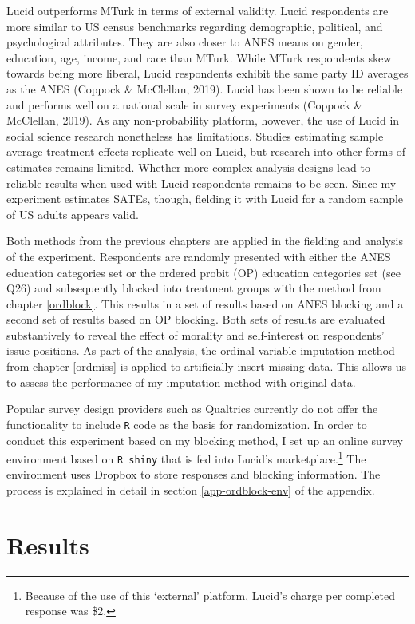 \documentclass[12pt,econ]{sources/authesis}
\begin{document}
Lucid outperforms MTurk in terms of external validity. Lucid respondents are more similar to US census benchmarks regarding demographic, political, and psychological attributes. They are also closer to ANES means on gender, education, age, income, and race than MTurk. While MTurk respondents skew towards being more liberal, Lucid respondents exhibit the same party ID averages as the ANES (Coppock \& McClellan, 2019). Lucid has been shown to be reliable and performs well on a national scale in survey experiments (Coppock \& McClellan, 2019). As any non-probability platform, however, the use of Lucid in social science research nonetheless has limitations. Studies estimating sample average treatment effects replicate well on Lucid, but research into other forms of estimates remains limited. Whether more complex analysis designs lead to reliable results when used with Lucid respondents remains to be seen. Since my experiment estimates SATEs, though, fielding it with Lucid for a random sample of US adults appears valid.

Both methods from the previous chapters are applied in the fielding and analysis of the experiment. Respondents are randomly presented with either the ANES education categories set or the ordered probit (OP) education categories set (see Q26) and subsequently blocked into treatment groups with the method from chapter \ref{ordblock}. This results in a set of results based on ANES blocking and a second set of results based on OP blocking. Both sets of results are evaluated substantively to reveal the effect of morality and self-interest on respondents' issue positions. As part of the analysis, the ordinal variable imputation method from chapter \ref{ordmiss} is applied to artificially insert missing data. This allows us to assess the performance of my imputation method with original data.

Popular survey design providers such as Qualtrics currently do not offer the functionality to include \texttt{R} code as the basis for randomization. In order to conduct this experiment based on my blocking method, I set up an online survey environment based on \texttt{R\ shiny} that is fed into Lucid's marketplace.\footnote{Because of the use of this `external' platform, Lucid's charge per completed response was \$2.} The environment uses Dropbox to store responses and blocking information. The process is explained in detail in section \ref{app-ordblock-env} of the appendix.

\hypertarget{framing-results}{%
\section{Results}\label{framing-results}}
\end{document}
